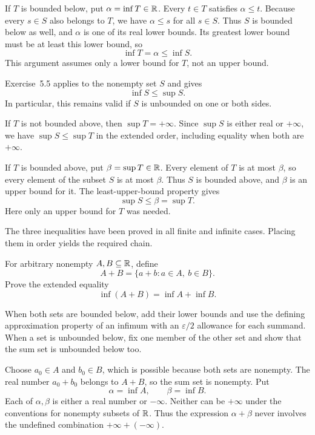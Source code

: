 If $T$ is bounded below, put $\alpha=\inf T\in\mathbb{R}$.
Every $t\in T$ satisfies $\alpha\le t$. Because every $s\in S$
also belongs to $T$, we have $\alpha\le s$ for all $s\in S$.
Thus $S$ is bounded below as well, and $\alpha$ is one of its real
lower bounds. Its greatest lower bound must be at least this lower
bound, so
\[
 \inf T=\alpha\le\inf S.
\]
This argument assumes only a lower bound for $T$, not an upper bound.

Exercise~5.5 applies to the nonempty set $S$ and gives
\[
 \inf S\le\sup S.
\]
In particular, this remains valid if $S$ is unbounded on one or both
sides.

If $T$ is not bounded above, then $\sup T=+\infty$.
Since $\sup S$ is either real or $+\infty$, we have
$\sup S\le\sup T$ in the extended order, including equality when
both are $+\infty$.

If $T$ is bounded above, put $\beta=\sup T\in\mathbb{R}$.
Every element of $T$ is at most $\beta$, so every element of the
subset $S$ is at most $\beta$. Thus $S$ is bounded above, and
$\beta$ is an upper bound for it. The least-upper-bound property gives
\[
 \sup S\le\beta=\sup T.
\]
Here only an upper bound for $T$ was needed.

The three inequalities have been proved in all finite and infinite
cases. Placing them in order yields the required chain.


\goal For arbitrary nonempty $A,B\subseteq\mathbb{R}$, define
\[
 A+B=\{a+b:a\in A,\ b\in B\}.
\]
Prove the extended equality
\[
 \inf(A+B)=\inf A+\inf B.
\]

\idea When both sets are bounded below, add their lower bounds and
use the defining approximation property of an infimum with an
$\varepsilon/2$ allowance for each summand. When a set is unbounded
below, fix one member of the other set and show that the sum set is
unbounded below too.

Choose $a_0\in A$ and $b_0\in B$, which is possible because both
sets are nonempty. The real number $a_0+b_0$ belongs to $A+B$,
so the sum set is nonempty. Put
\[
 \alpha=\inf A,\qquad \beta=\inf B.
\]
Each of $\alpha,\beta$ is either a real number or $-\infty$.
Neither can be $+\infty$ under the conventions for nonempty subsets
of $\mathbb{R}$. Thus the expression $\alpha+\beta$ never involves the
undefined combination $+\infty+(-\infty)$.

